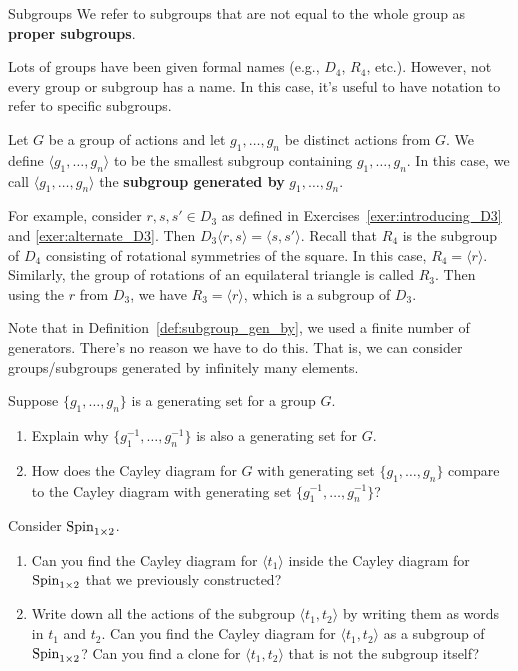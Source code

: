 \begin{section}{Subgroups}
We refer to subgroups that are not equal to the whole group as \textbf{proper subgroups}.

Lots of groups have been given formal names (e.g., $D_4$, $R_4$, etc.).  However, not every group or subgroup has a name.  In this case, it's useful to have notation to refer to specific subgroups.

\begin{definition}\label{def:subgroup_gen_by}
Let $G$ be a group of actions and let $g_1,\ldots, g_n$ be distinct actions from $G$.  We define $\langle g_1,\ldots, g_n\rangle$ to be the smallest subgroup containing $g_1,\ldots, g_n$.  In this case, we call $\langle g_1,\ldots, g_n\rangle$ the \textbf{subgroup generated by} $g_1,\ldots, g_n$.
\end{definition}

For example, consider $r, s, s'\in D_3$ as defined in Exercises~\ref{exer:introducing_D3} and \ref{exer:alternate_D3}.  Then $D_3\langle r,s\rangle=\langle s, s'\rangle$.  Recall that $R_4$ is the subgroup of $D_4$ consisting of rotational symmetries of the square. In this case, $R_4=\langle r\rangle$.  Similarly, the group of rotations of an equilateral triangle is called $R_3$.  Then using the $r$ from $D_3$, we have $R_3=\langle r\rangle$, which is a subgroup of $D_3$.

Note that in Definition~\ref{def:subgroup_gen_by}, we used a finite number of generators.  There's no reason we have to do this.  That is, we can consider groups/subgroups generated by infinitely many elements.

\begin{exercise}
Suppose $\{g_1,\ldots,g_n\}$ is a generating set for a group $G$.
\begin{enumerate}[label=\rm{(\alph*)}]
\item Explain why $\{g^{-1}_1,\ldots,g^{-1}_n\}$ is also a generating set for $G$.
\item How does the Cayley diagram for $G$ with generating set $\{g_1,\ldots,g_n\}$ compare to the Cayley diagram with generating set $\{g^{-1}_1,\ldots,g^{-1}_n\}$?
\end{enumerate}
\end{exercise}

\begin{exercise}
Consider $\operatorname{Spin}_{1\times 2}$.  
\begin{enumerate}[label=\rm{(\alph*)}]
\item Can you find the Cayley diagram for $\langle t_1\rangle$ inside the Cayley diagram for $\operatorname{Spin}_{1\times 2}$ that we previously constructed?
\item Write down all the actions of the subgroup $\langle t_1, t_2\rangle$ by writing them as words in $t_1$ and $t_2$.  Can you find the Cayley diagram for $\langle t_1, t_2\rangle$ as a subgroup of $\operatorname{Spin}_{1\times 2}$?  Can you find a clone for $\langle t_1, t_2\rangle$ that is not the subgroup itself?
\end{enumerate}
\end{exercise}


\end{section}
